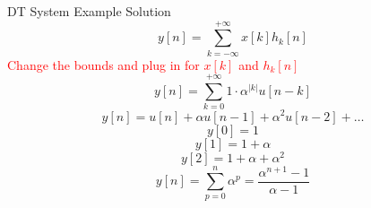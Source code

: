 \begin{frame}{DT System Example Solution}
    \[y[n] = \sum_{k=-\infty}^{+\infty}x[k]h_k[n]\]
    \textcolor{red}{Change the bounds and plug in for $x[k]$ and $h_k[n]$}
    \[y[n] = \sum_{k=0}^{+\infty}1\cdot \alpha^{|k|}u[n-k]\]
    \[y[n] = u[n] + \alpha u[n-1] + \alpha^2 u[n-2] + \dots\]
    \[y[0] = 1\]
    \[y[1] = 1+\alpha\]
    \[y[2] = 1+\alpha+\alpha^2\]
    \[y[n] = \sum_{p=0}^n \alpha^p = \frac{\alpha^{n+1}-1}{\alpha -1}\]

\end{frame}
